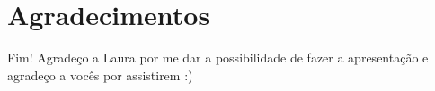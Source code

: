 \section*{Agradecimentos}

\begin{frame}
	\begin{block}{Fim!}
		Agradeço a Laura por me dar a possibilidade de fazer a apresentação e agradeço a vocês por assistirem :)
	\end{block}
\end{frame}
